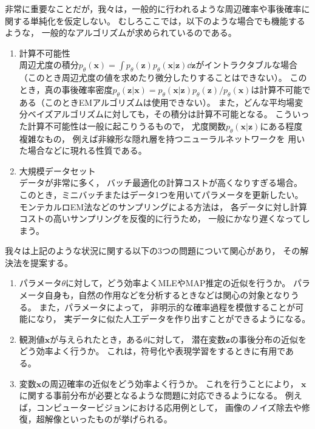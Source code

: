\documentclass[dvipdfmx, fleqn]{jsarticle}
\begin{document}
非常に重要なことだが，我々は，一般的に行われるような周辺確率や事後確率に関する単純化を仮定しない。
むしろここでは，以下のような場合でも機能するような，
一般的なアルゴリズムが求められているのである。

\begin{enumerate}
    \item 計算不可能性 \\
        周辺尤度の積分\(p_{\theta} (\bm{x}) = \int p_{\theta} (\bm{z}) p_{\theta} (\bm{x}|\bm{z}) \dd\bm{z}\)がイントラクタブルな場合（このとき周辺尤度の値を求めたり微分したりすることはできない）。
        このとき，真の事後確率密度\(p_\theta (\bm{z}|\bm{x}) = p_{\theta} (\bm{x}|\bm{z}) p_{\theta} (\bm{z}) / p_{\theta} (\bm{x})\)は計算不可能である（このときEMアルゴリズムは使用できない）。
        また，どんな平均場変分ベイズアルゴリズムに対しても，その積分は計算不可能となる。
        こういった計算不可能性は一般に起こりうるもので，
        尤度関数\(p_{\theta} (\bm{x}|\bm{z})\)にある程度複雑なもの，
        例えば非線形な隠れ層を持つニューラルネットワークを
        用いた場合などに現れる性質である。
    \item 大規模データセット \\
        データが非常に多く，
        バッチ最適化の計算コストが高くなりすぎる場合。
        このとき，ミニバッチまたはデータ1つを用いてパラメータを更新したい。
        モンテカルロEM法などのサンプリングによる方法は，
        各データに対し計算コストの高いサンプリングを反復的に行うため，
        一般にかなり遅くなってしまう。
\end{enumerate}

我々は上記のような状況に関する以下の3つの問題について関心があり，
その解決法を提案する。

\begin{enumerate}
    \item
        パラメータ\(\theta\)に対して，どう効率よくMLEやMAP推定の近似を行うか。
        パラメータ自身も，自然の作用などを分析するときなどは関心の対象となりうる。
        また，パラメータによって，
        非明示的な確率過程を模倣することが可能になり，
        実データに似た人工データを作り出すことができるようになる。
    \item
        観測値\(\bm{x}\)が与えられたとき，ある\(\theta\)に対して，
        潜在変数\(\bm{z}\)の事後分布の近似をどう効率よく行うか。
        これは，符号化や表現学習をするときに有用である。
    \item
        変数\(\bm{x}\)の周辺確率の近似をどう効率よく行うか。
        これを行うことにより，
        \(\bm{x}\)に関する事前分布が必要となるような問題に対応できるようになる。
        例えば，コンピュータービジョンにおける応用例として，
        画像のノイズ除去や修復，超解像といったものが挙げられる。
\end{enumerate}
\end{document}
